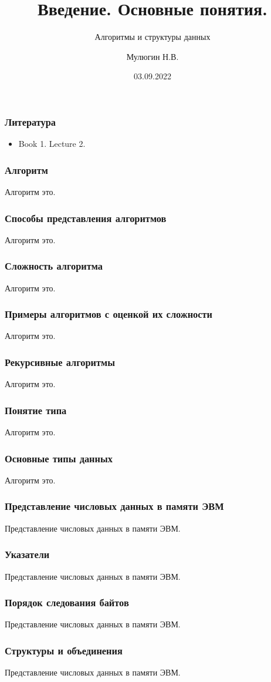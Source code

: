 \documentclass[russian, 12pt]{beamer}
\title{Введение. Основные понятия.}
\subtitle{Алгоритмы и структуры данных}
\author{Мулюгин Н.\texorpdfstring{\thinspace}{Lg}В.}
\date{03.09.2022}
\begin{document}
\begin{frame}
\titlepage
\end{frame}
\begin{frame}
\frametitle{Литература}
  \begin{itemize}
    \item Book 1. Lecture 2.
  \end{itemize}
\end{frame}
\begin{frame}
\frametitle{Алгоритм}
Алгоритм это.
\end{frame}
\begin{frame}
\frametitle{Способы представления алгоритмов}
Алгоритм это.
\end{frame}
\begin{frame}
\frametitle{Сложность алгоритма}
Алгоритм это.
\end{frame}
\begin{frame}
\frametitle{Примеры алгоритмов с оценкой их сложности}
Алгоритм это.
\end{frame}
\begin{frame}
\frametitle{Рекурсивные алгоритмы}
Алгоритм это.
\end{frame}
\begin{frame}
\frametitle{Понятие типа}
Алгоритм это.
\end{frame}
\begin{frame}
\frametitle{Основные типы данных}
Алгоритм это.
\end{frame}
\begin{frame}
\frametitle{Представление числовых данных в памяти ЭВМ}
Представление числовых данных в памяти ЭВМ.
\end{frame}
\begin{frame}
\frametitle{Указатели}
Представление числовых данных в памяти ЭВМ.
\end{frame}
\begin{frame}
\frametitle{Порядок следования байтов}
Представление числовых данных в памяти ЭВМ.
\end{frame}
\begin{frame}
\frametitle{Структуры и объединения }
Представление числовых данных в памяти ЭВМ.
\end{frame}
\end{document}
